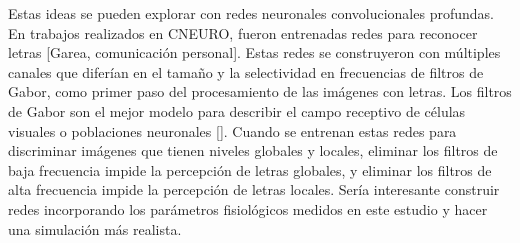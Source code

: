 Estas ideas se pueden explorar con redes neuronales convolucionales profundas. En trabajos realizados en CNEURO, fueron entrenadas redes para reconocer letras [Garea, comunicación personal]. Estas redes se construyeron con múltiples canales que diferían en el tamaño y la selectividad en frecuencias de filtros de Gabor, como primer paso del procesamiento de las imágenes con letras. Los filtros de Gabor son el mejor modelo para describir el campo receptivo de células visuales o poblaciones neuronales [\cite{kriegeskorte_understanding_2011}]. Cuando se entrenan estas redes para discriminar im\'agenes que tienen niveles globales y locales, eliminar los filtros de baja frecuencia impide la percepción de letras globales, y eliminar los filtros de alta frecuencia impide la percepción de letras locales. Sería interesante construir redes incorporando los parámetros fisiológicos medidos en este estudio y hacer una simulación más realista.
